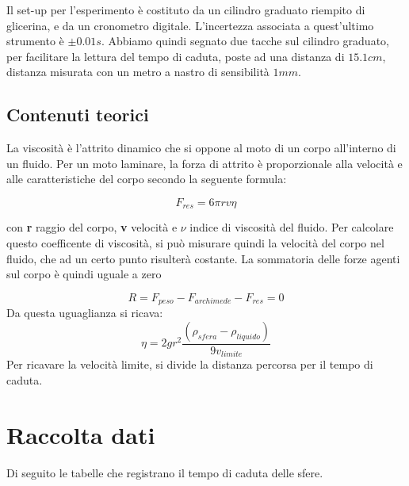 Il set-up per l'esperimento è costituto da un cilindro graduato riempito di glicerina, e  da un cronometro digitale. L'incertezza associata a quest'ultimo strumento è $\pm0.01s$. Abbiamo quindi segnato due tacche sul cilindro graduato, per facilitare la lettura del tempo di caduta, poste ad una distanza di $15.1 cm$, distanza misurata con un metro a nastro di sensibilità $1mm$.

\subsection{Contenuti teorici}
La viscosità è l'attrito dinamico che si oppone al moto di un corpo all'interno di un fluido. Per un moto laminare, la forza di attrito è proporzionale alla velocità e alle caratteristiche del corpo secondo la seguente formula:

$$F_{res} = 6 \pi r v \eta $$

con \textbf{r}  raggio del corpo,\textbf{ v} velocità e $\nu$ indice di viscosità del fluido. 
Per calcolare questo coefficente di viscosità, si può misurare quindi la velocità del corpo nel fluido, che ad un certo punto risulterà costante. La sommatoria delle forze agenti sul corpo è quindi uguale a zero

$$ R = F_{peso} - F_{archimede} - F_{res} = 0 $$
Da questa uguaglianza si ricava:
\\
\begin{equation}\label{eta}
\eta= 2 g r^2\frac{(\rho_{sfera} - \rho_{liquido})}{9v_{limite}}
\end{equation}
\clearpage
Per ricavare la velocità limite, si divide la distanza percorsa per il tempo di caduta. 

\section{Raccolta dati}
Di seguito le tabelle che registrano il tempo di caduta delle sfere.
